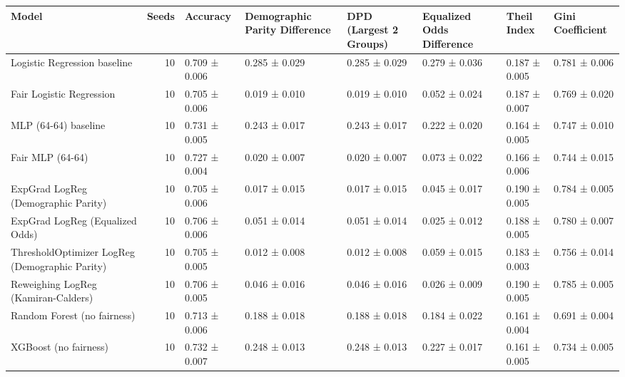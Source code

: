 \begin{tabular}{lrllllll}
\toprule
Model & Seeds & Accuracy & Demographic Parity Difference & DPD (Largest 2 Groups) & Equalized Odds Difference & Theil Index & Gini Coefficient \\
\midrule
Logistic Regression baseline & 10 & 0.709 ± 0.006 & 0.285 ± 0.029 & 0.285 ± 0.029 & 0.279 ± 0.036 & 0.187 ± 0.005 & 0.781 ± 0.006 \\
Fair Logistic Regression & 10 & 0.705 ± 0.006 & 0.019 ± 0.010 & 0.019 ± 0.010 & 0.052 ± 0.024 & 0.187 ± 0.007 & 0.769 ± 0.020 \\
MLP (64-64) baseline & 10 & 0.731 ± 0.005 & 0.243 ± 0.017 & 0.243 ± 0.017 & 0.222 ± 0.020 & 0.164 ± 0.005 & 0.747 ± 0.010 \\
Fair MLP (64-64) & 10 & 0.727 ± 0.004 & 0.020 ± 0.007 & 0.020 ± 0.007 & 0.073 ± 0.022 & 0.166 ± 0.006 & 0.744 ± 0.015 \\
ExpGrad LogReg (Demographic Parity) & 10 & 0.705 ± 0.006 & 0.017 ± 0.015 & 0.017 ± 0.015 & 0.045 ± 0.017 & 0.190 ± 0.005 & 0.784 ± 0.005 \\
ExpGrad LogReg (Equalized Odds) & 10 & 0.706 ± 0.006 & 0.051 ± 0.014 & 0.051 ± 0.014 & 0.025 ± 0.012 & 0.188 ± 0.005 & 0.780 ± 0.007 \\
ThresholdOptimizer LogReg (Demographic Parity) & 10 & 0.705 ± 0.005 & 0.012 ± 0.008 & 0.012 ± 0.008 & 0.059 ± 0.015 & 0.183 ± 0.003 & 0.756 ± 0.014 \\
Reweighing LogReg (Kamiran-Calders) & 10 & 0.706 ± 0.005 & 0.046 ± 0.016 & 0.046 ± 0.016 & 0.026 ± 0.009 & 0.190 ± 0.005 & 0.785 ± 0.005 \\
Random Forest (no fairness) & 10 & 0.713 ± 0.006 & 0.188 ± 0.018 & 0.188 ± 0.018 & 0.184 ± 0.022 & 0.161 ± 0.004 & 0.691 ± 0.004 \\
XGBoost (no fairness) & 10 & 0.732 ± 0.007 & 0.248 ± 0.013 & 0.248 ± 0.013 & 0.227 ± 0.017 & 0.161 ± 0.005 & 0.734 ± 0.005 \\
\bottomrule
\end{tabular}
